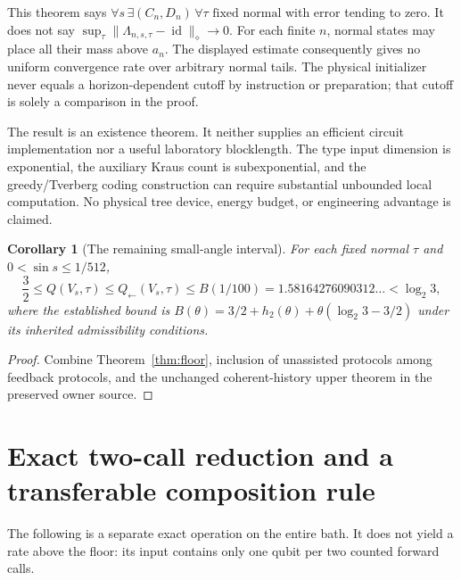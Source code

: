 \documentclass[11pt]{article}
\newtheorem{corollary}[theorem]{Corollary}
\newcommand{\id}{\operatorname{id}}
\newcommand{\norm}[1]{\lVert #1\rVert}
\begin{document}
This theorem says $\forall s\,\exists(C_n,D_n)\,\forall\tau\text{ fixed normal}$ with error tending to zero. It does not say $\sup_\tau\norm{\Lambda_{n,s,\tau}-\id}_\diamond\to0$. For each finite $n$, normal states may place all their mass above $a_n$. The displayed estimate consequently gives no uniform convergence rate over arbitrary normal tails. The physical initializer never equals a horizon-dependent cutoff by instruction or preparation; that cutoff is solely a comparison in the proof.

The result is an existence theorem. It neither supplies an efficient circuit implementation nor a useful laboratory blocklength. The type input dimension is exponential, the auxiliary Kraus count is subexponential, and the greedy/Tverberg coding construction can require substantial unbounded local computation. No physical tree device, energy budget, or engineering advantage is claimed.

\begin{corollary}[The remaining small-angle interval]\label{cor:bracket}
For each fixed normal $\tau$ and $0<\sin s\le1/512$,
\begin{equation}
 \frac32\le Q(V_s,\tau)\le Q_{\leftarrow}(V_s,\tau)
 \le B(1/100)=1.58164276090312\ldots<\log_2 3,
 \label{eq:bracket}
\end{equation}
where the established bound is
$B(\theta)=3/2+h_2(\theta)+\theta(\log_2 3-3/2)$ under its inherited admissibility conditions.
\end{corollary}
\begin{proof}
Combine Theorem~\ref{thm:floor}, inclusion of unassisted protocols among feedback protocols, and the unchanged coherent-history upper theorem in the preserved owner source.
\end{proof}

\section{Exact two-call reduction and a transferable composition rule}\label{sec:erasure}

The following is a separate exact operation on the entire bath. It does not yield a rate above the floor: its input contains only one qubit per two counted forward calls.
\end{document}
